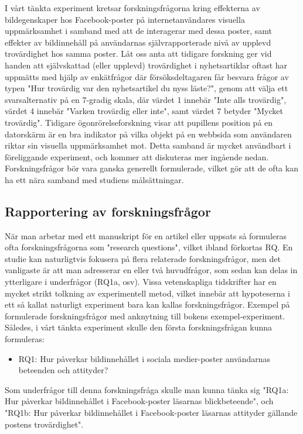 \documentclass[
]{book}
\providecommand{\tightlist}{%
  \setlength{\itemsep}{0pt}\setlength{\parskip}{0pt}}
\begin{document}
I vårt tänkta experiment kretsar forskningsfrågorna kring effekterna av bildegenskaper hos Facebook-poster på internetanvändares visuella uppmärksamhet i samband med att de interagerar med dessa poster, samt effekter av bildinnehåll på användarnas självrapporterade nivå av upplevd trovärdighet hos samma poster. Låt oss anta att tidigare forskning ger vid handen att självskattad (eller upplevd) trovärdighet i nyhetsartiklar oftast har uppmätts med hjälp av enkätfrågor där försöksdeltagaren får besvara frågor av typen "Hur trovärdig var den nyhetsartikel du nyss läste?", genom att välja ett svarsalternativ på en 7-gradig skala, där värdet 1 innebär "Inte alls trovärdig", värdet 4 innebär "Varken trovärdig eller inte", samt värdet 7 betyder "Mycket trovärdig". Tidigare ögonrörelseforskning visar att pupillens position på en datorskärm är en bra indikator på vilka objekt på en webbsida som användaren riktar sin visuella uppmärksamhet mot. Detta samband är mycket användbart i föreliggande experiment, och kommer att diskuteras mer ingående nedan. Forskningsfrågor bör vara ganska generellt formulerade, vilket gör att de ofta kan ha ett nära samband med studiens målsättningar.

\hypertarget{sub06.1.2}{%
\subsection{Rapportering av forskningsfrågor}\label{sub06.1.2}}

När man arbetar med ett manuskript för en artikel eller uppsats så formuleras ofta forskningsfrågorna som "research questions", vilket ibland förkortas RQ. En studie kan naturligtvis fokusera på flera relaterade forskningsfrågor, men det vanligaste är att man adresserar en eller två huvudfrågor, som sedan kan delas in ytterligare i underfrågor (RQ1a, osv). Vissa vetenskapliga tidskrifter har en mycket strikt tolkning av experimentell metod, vilket innebär att hypoteserna i ett så kallat naturligt experiment bara kan kallas forskningsfrågor. Exempel på formulerade forskningsfrågor med anknytning till bokens exempel-experiment. Således, i vårt tänkta experiment skulle den första forskningsfrågan kunna formuleras:

\begin{itemize}
\tightlist
\item
  RQ1: Hur påverkar bildinnehållet i sociala medier-poster användarnas beteenden och attityder?
\end{itemize}

Som underfrågor till denna forskningsfråga skulle man kunna tänka sig "RQ1a: Hur påverkar bildinnehållet i Facebook-poster läsarnas blickbeteende", och "RQ1b: Hur påverkar bildinnehållet i Facebook-poster läsarnas attityder gällande postens trovärdighet".
\end{document}
